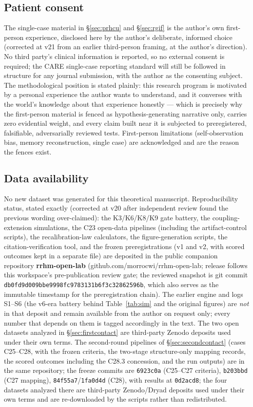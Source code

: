 \documentclass[9pt,twocolumn]{article}
\begin{document}
\subsection*{Patient consent}
The single-case material in \S\ref{sec:prhcu} and \S\ref{sec:rgif} is the author's own first-person experience, disclosed here by the author's deliberate, informed choice (corrected at v21 from an earlier third-person framing, at the author's direction). No third party's clinical information is reported, so no external consent is required; the CARE single-case reporting standard will still be followed in structure for any journal submission, with the author as the consenting subject. The methodological position is stated plainly: this research program is motivated by a personal experience the author wants to understand, and it converses with the world's knowledge about that experience honestly --- which is precisely why the first-person material is fenced as hypothesis-generating narrative only, carries zero evidential weight, and every claim built near it is subjected to preregistered, falsifiable, adversarially reviewed tests. First-person limitations (self-observation bias, memory reconstruction, single case) are acknowledged and are the reason the fences exist.

\subsection*{Data availability}
No new dataset was generated for this theoretical manuscript. Reproducibility status, stated exactly (corrected at v20 after independent review found the previous wording over-claimed): the K3/K6/K8/K9 gate battery, the coupling-extension simulations, the C23 open-data pipelines (including the artifact-control scripts), the recalibration-law calculators, the figure-generation scripts, the citation-verification tool, and the frozen preregistrations (v1 and v2, with scored outcomes kept in a separate file) are deposited in the public companion repository \textbf{rrhm-open-lab} (github.com/morrocwi/rrhm-open-lab; release follows this workspace's pre-publication review gate; the reviewed snapshot is git commit \texttt{db0fd9d009bbe9998fc9783131b6f3c32862596b}, which also serves as the immutable timestamp for the preregistration chain). The earlier engine and logs S1--S6 (the v6-era battery behind Table~\ref{tab:sim} and the original figures) are \emph{not} in that deposit and remain available from the author on request only; every number that depends on them is tagged accordingly in the text. The two open datasets analyzed in \S\ref{sec:firstcontact} are third-party Zenodo deposits used under their own terms. The second-round pipelines of \S\ref{sec:secondcontact} (cases C25--C28, with the frozen criteria, the two-stage structure-only mapping records, the scored outcomes including the C28.3 concession, and the run outputs) are in the same repository; the freeze commits are \texttt{6923c0a} (C25--C27 criteria), \texttt{b203bbd} (C27 mapping), \texttt{84f55a7}/\texttt{1fa0d4d} (C28), with results at \texttt{0d2acd8}; the four datasets analyzed there are third-party Zenodo/Dryad deposits used under their own terms and are re-downloaded by the scripts rather than redistributed.
\end{document}
